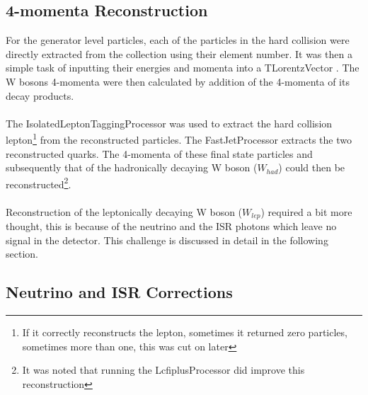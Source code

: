 \subsection{4-momenta Reconstruction}
\label{SUBSEC:4momentaReconstruction}
For the generator level particles, each of the particles in the hard collision were directly extracted from the collection using their element number. It was then a simple task of inputting their energies and momenta into a TLorentzVector \cite{fons_rademakers_2019_3336325}. The W bosons 4-momenta were then calculated by addition of the 4-momenta of its decay products.
\\\\
The IsolatedLeptonTaggingProcessor \cite{IsolatedLeptonTaggingProcessor} was used to extract the hard collision lepton\footnote{If it correctly reconstructs the lepton, sometimes it returned zero particles, sometimes more than one, this was cut on later} from the reconstructed particles. The FastJetProcessor \cite{Cacciari:2011ma} extracts the two reconstructed quarks. The 4-momenta of these final state particles and subsequently that of the hadronically decaying W boson (${W}_{had}$) could then be reconstructed\footnote{It was noted that running the LcfiplusProcessor \cite{reVertex} did improve this reconstruction}.
\\\\
Reconstruction of the leptonically decaying W boson (${W}_{lep}$) required a bit more thought, this is because of the neutrino and the ISR photons which leave no signal in the detector. This challenge is discussed in detail in the following section.

\subsection{Neutrino and ISR Corrections}
